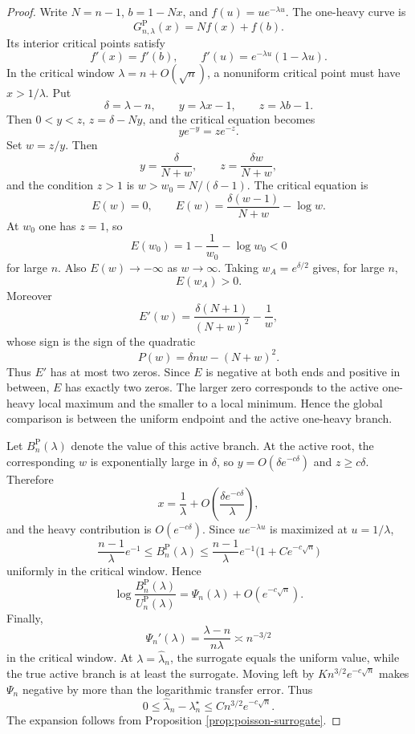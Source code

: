 \documentclass[11pt]{article}
\theoremstyle{definition}
\begin{document}
\begin{proof}
Write $N=n-1$, $b=1-Nx$, and $f(u)=u e^{-\lambda u}$.  The one-heavy curve is
\[
  G^{\mathrm P}_{n,\lambda}(x)=Nf(x)+f(b).
\]
Its interior critical points satisfy
\[
  f'(x)=f'(b),
  \qquad
  f'(u)=e^{-\lambda u}(1-\lambda u).
\]
In the critical window $\lambda=n+O(\sqrt n)$, a nonuniform critical point must have $x>1/\lambda$.  Put
\[
  \delta=\lambda-n,
  \qquad
  y=\lambda x-1,
  \qquad
  z=\lambda b-1.
\]
Then $0<y<z$, $z=\delta-Ny$, and the critical equation becomes
\[
  y e^{-y}=z e^{-z}.
\]
Set $w=z/y$.  Then
\[
  y=\frac{\delta}{N+w},
  \qquad
  z=\frac{\delta w}{N+w},
\]
and the condition $z>1$ is $w>w_0=N/(\delta-1)$.  The critical equation is
\[
  E(w)=0,
  \qquad
  E(w)=\frac{\delta(w-1)}{N+w}-\log w.
\]
At $w_0$ one has $z=1$, so
\[
  E(w_0)=1-\frac1{w_0}-\log w_0<0
\]
for large $n$. Also $E(w)\to -\infty$ as $w\to\infty$.  Taking $w_A=e^{\delta/2}$ gives, for large $n$,
\[
  E(w_A)>0.
\]
Moreover
\[
  E'(w)=\frac{\delta(N+1)}{(N+w)^2}-\frac1w,
\]
whose sign is the sign of the quadratic
\[
  P(w)=\delta n w-(N+w)^2.
\]
Thus $E'$ has at most two zeros.  Since $E$ is negative at both ends and positive in between, $E$ has exactly two zeros.  The larger zero corresponds to the active one-heavy local maximum and the smaller to a local minimum. Hence the global comparison is between the uniform endpoint and the active one-heavy branch.

Let $B^{\mathrm P}_n(\lambda)$ denote the value of this active branch.  At the active root, the corresponding $w$ is exponentially large in $\delta$, so $y=O(\delta e^{-c\delta})$ and $z\ge c\delta$.  Therefore
\[
  x=\frac1\lambda+O\left(\frac{\delta e^{-c\delta}}{\lambda}\right),
\]
and the heavy contribution is $O(e^{-c\delta})$.  Since $u e^{-\lambda u}$ is maximized at $u=1/\lambda$,
\[
  \frac{n-1}{\lambda}e^{-1}
  \le B^{\mathrm P}_n(\lambda)
  \le \frac{n-1}{\lambda}e^{-1}\bigl(1+C e^{-c\sqrt n}\bigr)
\]
uniformly in the critical window.  Hence
\[
  \log\frac{B^{\mathrm P}_n(\lambda)}{U^{\mathrm P}_n(\lambda)}
  =\Psi_n(\lambda)+O(e^{-c\sqrt n}).
\]
Finally,
\[
  \Psi_n'(\lambda)=\frac{\lambda-n}{n\lambda}\asymp n^{-3/2}
\]
in the critical window.  At $\lambda=\widehat\lambda_n$, the surrogate equals the uniform value, while the true active branch is at least the surrogate.  Moving left by $K n^{3/2}e^{-c\sqrt n}$ makes $\Psi_n$ negative by more than the logarithmic transfer error. Thus
\[
  0\le \widehat\lambda_n-\lambda_n^\star\le C n^{3/2}e^{-c\sqrt n}.
\]
The expansion follows from Proposition \ref{prop:poisson-surrogate}.
\end{proof}
\end{document}
